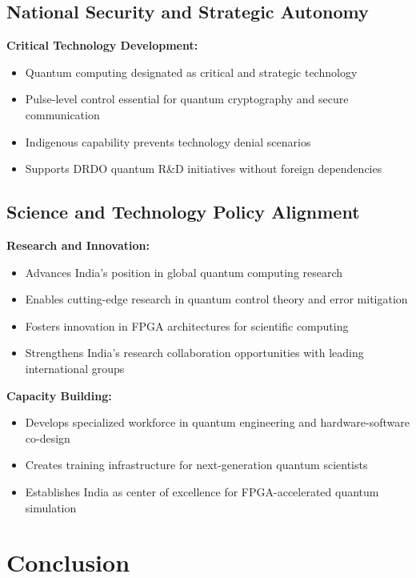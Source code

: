 \documentclass[12pt,a4paper]{article}
\begin{document}
\subsection{National Security and Strategic Autonomy}

\textbf{Critical Technology Development:}
\begin{itemize}[noitemsep]
\item Quantum computing designated as critical and strategic technology
\item Pulse-level control essential for quantum cryptography and secure communication
\item Indigenous capability prevents technology denial scenarios
\item Supports DRDO quantum R\&D initiatives without foreign dependencies
\end{itemize}

\subsection{Science and Technology Policy Alignment}

\textbf{Research and Innovation:}
\begin{itemize}[noitemsep]
\item Advances India's position in global quantum computing research
\item Enables cutting-edge research in quantum control theory and error mitigation
\item Fosters innovation in FPGA architectures for scientific computing
\item Strengthens India's research collaboration opportunities with leading international groups
\end{itemize}

\textbf{Capacity Building:}
\begin{itemize}[noitemsep]
\item Develops specialized workforce in quantum engineering and hardware-software co-design
\item Creates training infrastructure for next-generation quantum scientists
\item Establishes India as center of excellence for FPGA-accelerated quantum simulation
\end{itemize}

\newpage

\section{Conclusion}
\end{document}
